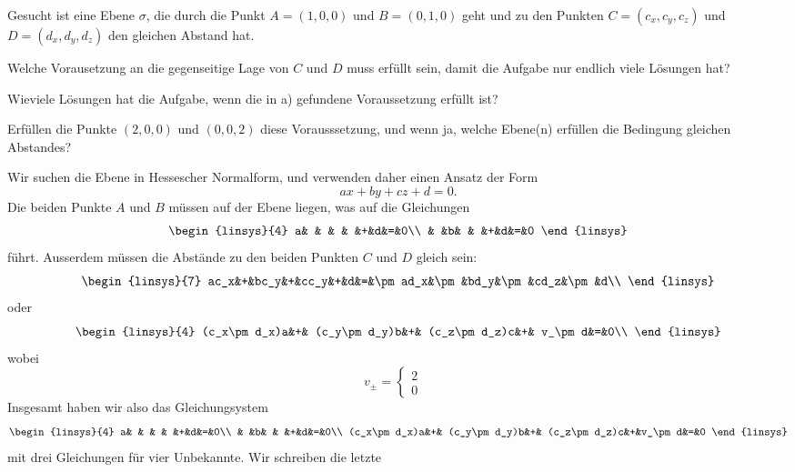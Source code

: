 Gesucht ist eine Ebene $\sigma$, die durch die Punkt $A=(1,0,0)$
und $B=(0,1,0)$ geht 
und zu den Punkten $C=(c_x,c_y,c_z)$ und $D=(d_x,d_y,d_z)$
den gleichen Abstand hat.
\begin{teilaufgaben}
\item Welche Vorausetzung an die gegenseitige Lage von $C$ und $D$
muss erfüllt sein, damit die Aufgabe nur endlich viele Lösungen hat?
\item Wieviele Lösungen hat die Aufgabe, wenn die in a) gefundene
Voraussetzung erfüllt ist?
\item Erfüllen die Punkte $(2,0,0)$ und $(0,0,2)$ diese Vorausssetzung,
und wenn ja, welche Ebene(n) erfüllen die Bedingung gleichen Abstandes?
\end{teilaufgaben}

\begin{loesung}
\begin{teilaufgaben}
\item
Wir suchen die Ebene in Hessescher Normalform, und verwenden daher einen
Ansatz der Form
\[
ax+by+cz+d=0.
\]
Die beiden Punkte $A$ und $B$ müssen auf der Ebene liegen,
was auf die Gleichungen
\[
\begin{linsys}{4}
a& & & &   &+&d&=&0\\
 & &b& &   &+&d&=&0
\end{linsys}
\]
führt.
Ausserdem müssen die Abstände zu den beiden Punkten $C$ und $D$ gleich
sein:
\[
\begin{linsys}{7}
ac_x&+&bc_y&+&cc_y&+&d&=&\pm ad_x&\pm&bd_y&\pm&cd_z&\pm&d\\
\end{linsys}
\]
oder
\begin{equation}
\begin{linsys}{4}
(c_x\pm d_x)a&+& (c_y\pm d_y)b&+& (c_z\pm d_z)c&+& v_\pm d&=&0\\
\end{linsys}
\label{30000032:vorzeichen}
\end{equation}
wobei
\[
v_\pm=\begin{cases}
2&\\
0&
\end{cases}
\]
Insgesamt haben wir also das Gleichungsystem
\[
\begin{linsys}{4}
a& & & &   &+&d&=&0\\
 & &b& &   &+&d&=&0\\
(c_x\pm d_x)a&+& (c_y\pm d_y)b&+& (c_z\pm d_z)c&+&v_\pm d&=&0
\end{linsys}
\]
mit drei Gleichungen für vier Unbekannte. Wir schreiben die letzte

\end{teilaufgaben}
\end{loesung}
